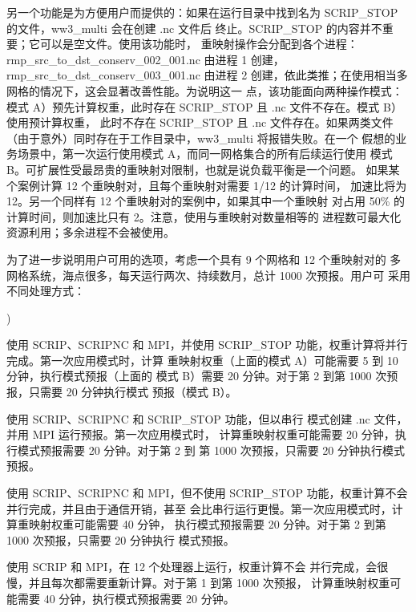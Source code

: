 另一个功能是为方便用户而提供的：如果在运行目录中找到名为
{\file SCRIP\_STOP} 的文件，{\file ww3\_multi} 会在创建 {\file .nc} 文件后
终止。{\file SCRIP\_STOP} 的内容并不重要；它可以是空文件。使用该功能时，
重映射操作会分配到各个进程：{\file rmp\_src\_to\_dst\_conserv\_002\_001.nc}
由进程 1 创建，{\file rmp\_src\_to\_dst\_conserv\_003\_001.nc} 由进程 2
创建，依此类推；在使用相当多网格的情况下，这会显著改善性能。为说明这一
点，该功能面向两种操作模式：模式 A）预先计算权重，此时存在
{\file SCRIP\_STOP} 且 {\file .nc} 文件不存在。模式 B）使用预计算权重，
此时不存在 {\file SCRIP\_STOP} 且 {\file .nc} 文件存在。如果两类文件
（由于意外）同时存在于工作目录中，{\file ww3\_multi} 将报错失败。在一个
假想的业务场景中，第一次运行使用模式 A，而同一网格集合的所有后续运行使用
模式 B。可扩展性受最昂贵的重映射对限制，也就是说负载平衡是一个问题。
如果某个案例计算 12 个重映射对，且每个重映射对需要 1/12 的计算时间，
加速比将为 12。另一个同样有 12 个重映射对的案例中，如果其中一个重映射
对占用 50\% 的计算时间，则加速比只有 2。注意，使用与重映射对数量相等的
进程数可最大化资源利用；多余进程不会被使用。

为了进一步说明用户可用的选项，考虑一个具有 9 个网格和 12 个重映射对的
多网格系统，海点很多，每天运行两次、持续数月，总计 1000 次预报。用户可
采用不同处理方式：

\begin{list}{)\hfill}
            { \leftmargin 15mm 
             \rightmargin 5mm \itemsep 0mm \parsep 0mm}

\item 使用 {\F SCRIP}、{\F SCRIPNC} 和 {\F MPI}，并使用
{\file SCRIP\_STOP} 功能，权重计算将并行完成。第一次应用模式时，计算
重映射权重（上面的模式 A）可能需要 5 到 10 分钟，执行模式预报（上面的
模式 B）需要 20 分钟。对于第 2 到第 1000 次预报，只需要 20 分钟执行模式
预报（模式 B）。

\item 使用 {\F SCRIP}、{\F SCRIPNC} 和 {\file SCRIP\_STOP} 功能，但以串行
模式创建 {\file .nc} 文件，并用 {\F MPI} 运行预报。第一次应用模式时，
计算重映射权重可能需要 20 分钟，执行模式预报需要 20 分钟。对于第 2 到
第 1000 次预报，只需要 20 分钟执行模式预报。

\item 使用 {\F SCRIP}、{\F SCRIPNC} 和 {\F MPI}，但不使用
{\file SCRIP\_STOP} 功能，权重计算不会并行完成，并且由于通信开销，甚至
会比串行运行更慢。第一次应用模式时，计算重映射权重可能需要 40 分钟，
执行模式预报需要 20 分钟。对于第 2 到第 1000 次预报，只需要 20 分钟执行
模式预报。

\item 使用 {\F SCRIP} 和 {\F MPI}，在 12 个处理器上运行，权重计算不会
并行完成，会很慢，并且每次都需要重新计算。对于第 1 到第 1000 次预报，
计算重映射权重可能需要 40 分钟，执行模式预报需要 20 分钟。

\end{list}

